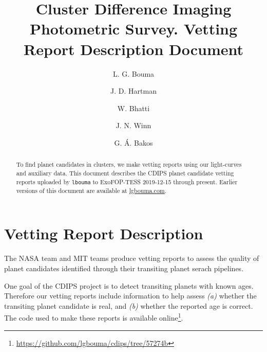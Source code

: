 \documentclass[12pt,twocolumn,tighten]{aastex62}
\begin{document}
\title{
  Cluster Difference Imaging Photometric Survey.
  Vetting Report Description Document
}


\author[0000-0002-0514-5538]{L. G. Bouma}
%
\author[0000-0001-8732-6166]{J. D. Hartman}
%
\author[0000-0002-0628-0088]{W. Bhatti}
%
\author[0000-0002-4265-047X]{J. N. Winn}
%
\author[0000-0001-7204-6727]{G. \'A. Bakos}

\begin{abstract}
To find planet candidates in clusters,
we make vetting reports using our light-curves \citep{bouma_cdips_2019} and
auxiliary data.
This document describes the CDIPS planet candidate vetting reports
uploaded by \texttt{lbouma} to ExoFOP-TESS 2019-12-15 through present.
Earlier versions of this document are available at
  \url{lgbouma.com}.
\\

\end{abstract}


\section{Vetting Report Description}
\label{appendix:vetreport}

The NASA team and MIT teams \citep{jenkins_spoc_2010,huang_tess_2018}
produce vetting reports to assess the quality of planet candidates
identified through their transiting planet serach pipelines.

One goal of the CDIPS project is to detect transiting planets with
known ages.  Therefore our vetting reports include information to help
assess {\it (a)} whether the transiting planet candidate is real, and
{\it (b)} whether the reported age is correct.
The code used to make these reports is available online\footnote{
  \url{https://github.com/lgbouma/cdips/tree/57274b}}.
\end{document}

